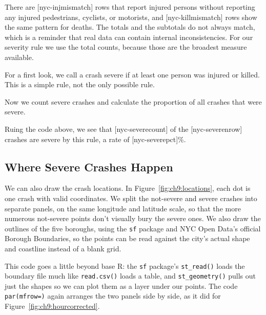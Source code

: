 
There are [nyc-injmismatch]
rows that report injured persons without reporting any injured pedestrians,
cyclists, or motorists, and
[nyc-killmismatch]
rows show the same pattern for deaths. The totals and the subtotals do
not always match, which is a reminder that real data can contain
internal inconsistencies. For our severity rule we use the total
counts, because those are the broadest measure available.

For a first look, we call a crash severe if at
least one person was injured or killed. This is a simple rule, not the
only possible rule.


Now we count severe crashes and calculate the proportion of all crashes
that were severe.


Ruing the code above, we see that
[nyc-severecount] of the
[nyc-severenrow] crashes are severe by this
rule, a rate of
[nyc-severepct]\%.

\subsection{Where Severe Crashes Happen}

We can also draw the crash locations. In
Figure~\ref{fig:ch9:locations}, each dot is one crash with valid
coordinates. We split the not-severe and severe crashes into separate
panels, on the same longitude and latitude scale, so that the more
numerous not-severe points don't visually bury the severe ones. We
also draw the outlines of the five boroughs, using the
\lstinline{sf} package and NYC Open Data's official Borough
Boundaries, so the points can be read against the city's actual shape
and coastline instead of a blank grid.


This code goes a little beyond base R: the \lstinline{sf} package's
\lstinline{st_read()} loads the boundary file much like
\lstinline{read.csv()} loads a table, and \lstinline{st_geometry()}
pulls out just the shapes so we can plot them as a layer under our
points. The code \lstinline{par(mfrow=)} again arranges the two panels side by
side, as it did for Figure~\ref{fig:ch9:hourcorrected}.

